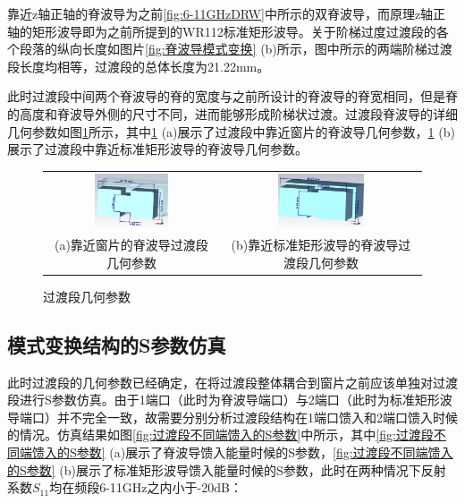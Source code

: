 \documentclass[master]{thesis-uestc}
\begin{document}
靠近z轴正轴的脊波导为之前\ref{fig:6-11GHzDRW}中所示的双脊波导，而原理z轴正轴的矩形波导即为之前所提到的WR112标准矩形波导。关于阶梯过度过渡段的各个段落的纵向长度如图片\ref{fig:脊波导模式变换} (b)所示，图中所示的两端阶梯过渡段长度均相等，过渡段的总体长度为21.22mm。

此时过渡段中间两个脊波导的脊的宽度与之前所设计的脊波导的脊宽相同，但是脊的高度和脊波导外侧的尺寸不同，进而能够形成阶梯状过渡。过渡段脊波导的详细几何参数如图\ref{fig:过渡段几何参数}所示，其中\ref{fig:过渡段几何参数} (a)展示了过渡段中靠近窗片的脊波导几何参数，\ref{fig:过渡段几何参数} (b)展示了过渡段中靠近标准矩形波导的脊波导几何参数。

\begin{figure}[!htb]
    \small
    \centering
    \begin{tabular}{@{\ }c@{\ }c}
        \includegraphics[width=0.45\textwidth]{pic/chapter3/靠近窗片的脊波导过渡段.png} & 
        \hspace{5pt}
        \includegraphics[width=0.45\textwidth]{pic/chapter3/靠近标准矩形波导的脊波导过渡段.png}     \\
        \mbox{\small (a)靠近窗片的脊波导过渡段几何参数}                                                                               & 
        \mbox{\small (b)靠近标准矩形波导的脊波导过渡段几何参数}                                                                                  \\
    \end{tabular}
    \caption{过渡段几何参数}
    \label{fig:过渡段几何参数}
\end{figure}

\subsection{模式变换结构的S参数仿真}
此时过渡段的几何参数已经确定，在将过渡段整体耦合到窗片之前应该单独对过渡段进行S参数仿真。由于1端口（此时为脊波导端口）与2端口（此时为标准矩形波导端口）并不完全一致，故需要分别分析过渡段结构在1端口馈入和2端口馈入时候的情况。仿真结果如图\ref{fig:过渡段不同端馈入的S参数}中所示，其中\ref{fig:过渡段不同端馈入的S参数} (a)展示了脊波导馈入能量时候的S参数，\ref{fig:过渡段不同端馈入的S参数} (b)展示了标准矩形波导馈入能量时候的S参数，此时在两种情况下反射系数$S_{11}$均在频段6-11GHz之内小于-20dB：
\end{document}
